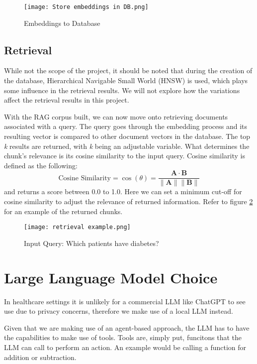\begin{figure}
	\texttt{[image: Store embeddings in DB.png]}
	\caption{Embeddings to Database}
	\centering
	\label{fig:EmbeddingsDatabase}
\end{figure}

\subsection{Retrieval}
While not the scope of the project, it should be noted that during the creation of the database, Hierarchical Navigable Small World (HNSW) is used, which plays some influence in the retrieval results. We will not explore how the variations affect the retrieval results in this project.

With the RAG corpus built, we can now move onto retrieving documents associated with a query.
The query goes through the embedding process and its resulting vector is compared to other document vectors in the database.
The top \textit{k} results are returned, with \textit{k} being an adjustable variable.
What determines the chunk's relevance is its cosine similarity to the input query.
Cosine similarity is defined as the following:
\[
	\text{Cosine Similarity} = \cos(\theta) = \frac{\mathbf{A} \cdot \mathbf{B}}{\|\mathbf{A}\| \|\mathbf{B}\|}
\]
and returns a score between 0.0 to 1.0.
Here we can set a minimum cut-off for cosine similarity to adjust the relevance of returned information.
Refer to figure \ref{fig:RetrievalExample} for an example of the returned chunks.

\begin{figure}
	\centering
	\texttt{[image: retrieval example.png]}
	\caption{Input Query: Which patients have diabetes?}
	\label{fig:RetrievalExample}
\end{figure}

\section{Large Language Model Choice}

In healthcare settings it is unlikely for a commercial LLM like ChatGPT to see use due to privacy concerns, therefore we make use of a local LLM instead.

Given that we are making use of an agent-based approach, the LLM has to have the capabilities to make use of tools. Tools are, simply put, funcitons that the LLM can call to perform an action. An example would be calling a function for addition or subtraction.

